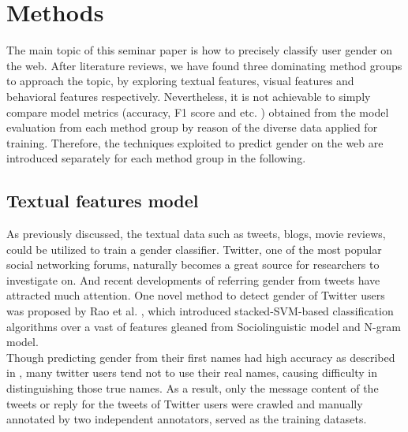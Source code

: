 \documentclass[runningheads]{llncs}
\begin{document}
	
	\section{Methods}
	
	The main topic of this seminar paper is how to precisely classify user gender on the web. After literature reviews, we have found three dominating method groups to approach the topic, by exploring textual features, visual features and behavioral features respectively. Nevertheless, it is not achievable to simply compare model metrics (accuracy, F1 score and etc. ) obtained from the model evaluation from each method group by reason of the diverse data applied for training. Therefore, the techniques exploited to predict gender on the web are introduced separately for each method group in the following. 
	
	\subsection{Textual features model}
	
	As previously discussed, the textual data such as tweets, blogs, movie reviews, could be utilized to train a gender classifier. Twitter, one of the most popular social networking forums, naturally becomes a great source for researchers to investigate on. And recent developments of referring gender from tweets have attracted much attention. One novel method to detect gender of Twitter users was proposed by Rao et al. \cite{rao2010classifying}, which introduced stacked-SVM-based classification algorithms over a vast of features gleaned from Sociolinguistic model and N-gram model.  \\
	Though predicting gender from their first names had high accuracy as described in \cite{karimi2016inferring}, many twitter users tend not to use their real names, causing difficulty in distinguishing those true names. As a result, only the message content of the tweets or reply for the tweets of Twitter users were crawled and manually annotated by two independent annotators, served as the training datasets.  \\
	
\end{document}
